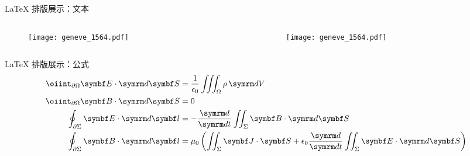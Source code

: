 
\begin{frame}{\LaTeX{} 排版展示：文本}
  \vspace{1em}
  \begin{columns}
    \begin{column}{.45\textwidth}
      \begin{figure}
        \texttt{[image: geneve\_1564.pdf]}
      \end{figure}
    \end{column}
    \begin{column}{.45\textwidth}
      \begin{figure}
        \texttt{[image: geneve\_1564.pdf]}
      \end{figure}
    \end{column}
  \end{columns}
\end{frame}

\begin{frame}{\LaTeX{} 排版展示：公式}
  \begin{align*}
    \oiint_{\partial\Omega} \V{E} \cdot \dd \V{S}
     & = \frac{1}{\epsilon_0} \iiint_\Omega \rho \, \dd V      \\
    \oiint_{\partial\Omega} \V{B} \cdot \dd \V{S}
     & = 0                                                     \\
    \oint_{\partial\Sigma} \V{E} \cdot \dd \V{l}
     & = -\frac{\dd}{\dd t} \iint_\Sigma \V{B} \cdot \dd \V{S} \\
    \oint_{\partial\Sigma} \V{B} \cdot \dd \V{l}
     & = \mu_0 \left( \iint_\Sigma \V{J} \cdot \V{S}
    + \epsilon_0 \frac{\dd}{\dd t} \iint_\Sigma \V{E} \cdot \dd \V{S} \right)
  \end{align*}
\end{frame}

